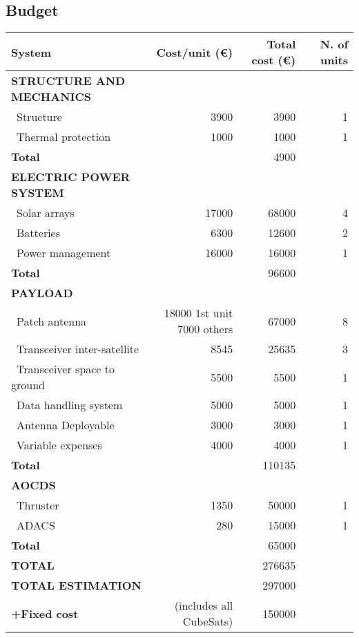 \subsection{Budget}

\begin{longtable}{| l | r | r | r |}
\rowcolor[gray]{0.80}	\textbf{System} & \textbf{Cost/unit (\euro)} & \textbf{Total cost (\euro)} & \textbf{N. of units}\\
    \hline
    \endfirsthead


\rowcolor[gray]{0.85} \textbf{STRUCTURE AND MECHANICS} & & & \\
   ~Structure & 3900 & 3900 & 1 \\
   ~Thermal protection & 1000  & 1000 & 1\\
   \hline
   \rowcolor[gray]{0.95} \textbf{Total} &  & 4900 &  \\
   \hline
   
\rowcolor[gray]{0.85} \textbf{ELECTRIC POWER SYSTEM} & & & \\
   ~Solar arrays & 17000 & 68000 & 4 \\
   ~Batteries & 6300 & 12600 & 2 \\
   ~Power management & 16000 & 16000 & 1 \\
   \hline
   \rowcolor[gray]{0.95} \textbf{Total} & & 96600 &  \\
   \hline

\rowcolor[gray]{0.85} \textbf{PAYLOAD} & & & \\

   ~Patch antenna & \makecell{18000 1st unit \\ 7000 others} & 67000 & 8 \\
   ~Transceiver inter-satellite & 8545 & 25635 & 3 \\
   ~Transceiver space to ground & 5500  & 5500 & 1 \\
   ~Data handling system & 5000 & 5000 & 1\\
   ~Antenna Deployable & 3000 & 3000 & 1\\
   ~Variable expenses & 4000 & 4000 & 1\\
   \hline
   \rowcolor[gray]{0.95} \textbf{Total} & & 110135 & \\
   \hline
   
\rowcolor[gray]{0.85} \textbf{AOCDS} & & &\\

   ~Thruster & 1350 & 50000 & 1 \\
   ~ADACS & 280 & 15000 & 1 \\
   \hline
   \rowcolor[gray]{0.95} \textbf{Total} & & 65000 & \\
   \hline

\rowcolor[gray]{0.9} \textbf{TOTAL} & & 276635 & \\
\hline
\rowcolor[gray]{0.9} \textbf{TOTAL ESTIMATION} & & 297000 & \\
\hline
\rowcolor[gray]{0.9} \textbf{+Fixed cost} & (includes all CubeSats) & 150000 & \\
\hline

\end{longtable} 

